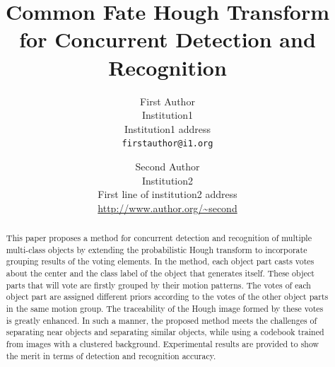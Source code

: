 \documentclass[10pt,twocolumn,letterpaper]{article}
\begin{document}
\title{Common Fate Hough Transform for Concurrent Detection and Recognition}

\author{First Author\\
Institution1\\
Institution1 address\\
{\tt\small firstauthor@i1.org}
\and
Second Author\\
Institution2\\
First line of institution2 address\\
{\small\url{http://www.author.org/~second}}
}

\maketitle


\begin{abstract}
This paper proposes a method for concurrent detection and recognition of multiple multi-class objects by extending the probabilistic Hough transform to incorporate grouping results of the voting elements. In the method, each object part casts votes about the center and the class label of the object that generates itself. These object parts that will vote are firstly grouped by their motion patterns. The votes of each object part are assigned different priors according to the votes of the other object parts in the same motion group. The traceability of the Hough image formed by these votes is greatly enhanced. In such a manner, the proposed method meets the challenges of separating near objects and separating similar objects, while using a codebook trained from images with a clustered background. Experimental results are provided to show the merit in terms of detection and recognition accuracy.

\end{abstract}
\end{document}
